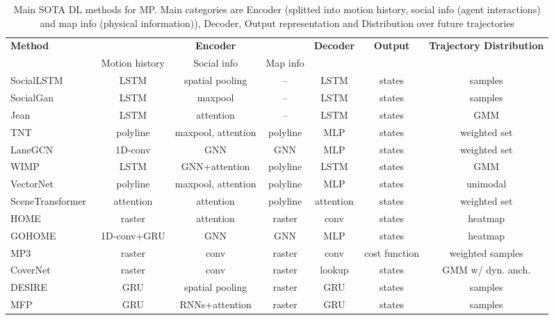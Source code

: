 \begin{table}[h!]
	\centering
	\caption[Main \ac{SOTA} \ac{DL} methods for \ac{MP}]{Main \ac{SOTA} \ac{DL} methods for \ac{MP}. Main categories are Encoder (splitted into motion history, social info (agent interactions) and map info (physical information)), Decoder, Output representation and Distribution over future trajectories}
	\begin{adjustbox}{max width=\textwidth}
		\begin{tabular}{l |ccc|c|c|c}
			\toprule
			\textbf{Method}	&	& \textbf{Encoder}	&	& \textbf{Decoder}	& \textbf{Output}  & \textbf{Trajectory Distribution}	\\
			& Motion history	& Social info	& Map info	&	&	&	\\
			\midrule
			SocialLSTM~\cite{alahi2016social}	& LSTM	& spatial pooling	& --	& LSTM	& states	& samples	\\
			SocialGan~\cite{gupta2018social}	& LSTM	& maxpool	& --	& LSTM	& states	& samples	\\
			Jean~\cite{mercat2020multi}	& LSTM	& attention	& --	& LSTM	& states	& GMM	\\
			TNT~\cite{zhao2021tnt}	& polyline	& maxpool, attention	& polyline	& MLP	& states	& weighted set	\\
			LaneGCN~\cite{liang2020learning}	& 1D-conv	& GNN	& GNN	& MLP	& states	& weighted set	\\
			WIMP~\cite{khandelwal2020if}	& LSTM	& GNN+attention	& polyline	& LSTM	& states	& GMM	\\
			VectorNet~\cite{gao2020vectornet}	& polyline	& maxpool, attention	& polyline	& MLP	& states	& unimodal	\\
			SceneTransformer~\cite{ngiam2022scene}	& attention	& attention	& polyline	& attention	& states	& weighted set	\\
			HOME~\cite{gilles2021home}	& raster	& attention	& raster	& conv	& states	& heatmap	\\
			GOHOME~\cite{gilles2022gohome}	& 1D-conv+GRU	& GNN	& GNN	& MLP	& states	& heatmap	\\
			MP3~\cite{casas2021mp3}	& raster	& conv	& raster	& conv	& cost function	& weighted samples	\\
			CoverNet~\cite{phan2020covernet}	& raster	& conv	& raster	& lookup	& states	& GMM w/ dyn. anch.	\\
			DESIRE~\cite{lee2017desire}	& GRU	& spatial pooling	& raster	& GRU	& states	& samples	\\
			MFP~\cite{tang2019multiple}	& GRU	& RNNs+attention	& raster	& GRU	& states	& samples	\\

\end{tabular}
\end{adjustbox}
\end{table}

